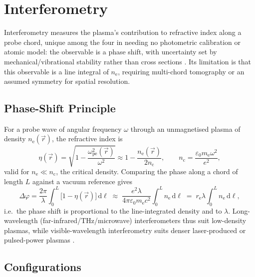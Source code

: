 \section{Interferometry}
\label{sec:specs-interferometry}

Interferometry measures the plasma's contribution to refractive index along a probe chord, unique among the four in needing no photometric calibration or atomic model: the observable is a phase shift, with uncertainty set by mechanical/vibrational stability rather than cross sections \cite{ref0391}. Its limitation is that this observable is a line integral of $n_{\mathrm{e}}$, requiring multi-chord tomography or an assumed symmetry for spatial resolution.

\subsection{Phase-Shift Principle}

For a probe wave of angular frequency $\omega$ through an unmagnetised plasma of density $n_{\mathrm{e}}(\vec{r})$, the refractive index is
\begin{equation}
\eta(\vec{r}) = \sqrt{1 - \frac{\omega_{\mathrm{pe}}^{2}(\vec{r})}{\omega^{2}}} \approx 1 - \frac{n_{\mathrm{e}}(\vec{r})}{2 n_{\mathrm{c}}} , \qquad n_{\mathrm{c}} = \frac{\varepsilon_{0} m_{\mathrm{e}} \omega^{2}}{e^{2}} ,
\label{eq:specs-refractive-index}
\end{equation}
valid for $n_{\mathrm{e}} \ll n_{\mathrm{c}}$, the critical density. Comparing the phase along a chord of length $L$ against a vacuum reference gives
\begin{equation}
\Delta\varphi = \frac{2\pi}{\lambda} \int_{0}^{L} \bigl[1 - \eta(\vec{r})\bigr] \, \mathrm{d}\ell \; \approx \; \frac{e^{2}\lambda}{4\pi \varepsilon_{0} m_{\mathrm{e}} c^{2}} \int_{0}^{L} n_{\mathrm{e}} \, \mathrm{d}\ell \; = \; r_{\mathrm{e}} \lambda \int_{0}^{L} n_{\mathrm{e}} \, \mathrm{d}\ell ,
\label{eq:specs-phase-shift}
\end{equation}
i.e.\ the phase shift is proportional to the line-integrated density and to $\lambda$. Long-wavelength (far-infrared/THz/microwave) interferometers thus suit low-density plasmas, while visible-wavelength interferometry suits denser laser-produced or pulsed-power plasmas \cite{ref0400}.

\subsection{Configurations}

